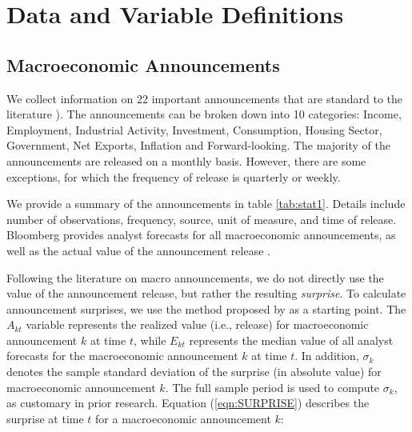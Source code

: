 \documentclass[12pt]{article}
\begin{document}

\section{Data and Variable Definitions}


\subsection{Macroeconomic Announcements}
 
We collect information on 22 important announcements that are standard to the literature   \citep[see e.g.][]{kurov2019price}). The announcements can be broken down into 10 categories: Income, Employment, Industrial Activity, Investment, Consumption, Housing Sector, Government, Net Exports, Inflation and Forward-looking. The majority of the announcements are released on a monthly basis. However, there are some exceptions, for which the frequency of release is quarterly or weekly. 

We provide a summary of the announcements in table \ref{tab:stat1}. Details include number of observations, frequency, source, unit of measure, and time of release. Bloomberg provides analyst forecasts for all macroeconomic announcements, as well as the actual value of the announcement release \citep[see e.g.,][]{kurov2019price}. 

Following the literature on macro announcements, we do not directly use the value of the announcement release, but rather the resulting \emph{surprise}. To calculate announcement surprises, we use the method proposed by \citet{balduzzi2001economic} as a starting point. The  $A_{kt}$ variable represents the realized value (i.e., release) for macroeconomic announcement $k$ at time $t$, while $E_{kt}$ represents the median value of all analyst forecasts for the macroeconomic announcement $k$ at time $t$. In addition, $\sigma_k$ denotes the sample standard deviation of the surprise (in absolute value) for macroeconomic announcement $k$. The full sample period is used to compute $\sigma_k$, as customary in prior research. Equation (\ref{eqn:SURPRISE}) describes the surprise at time $t$ for a macroeconomic announcement $k$:
\end{document}
